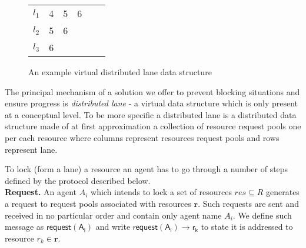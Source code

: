 \begin{figure}
\begin{center}
\begin{tabular}{ c | c | c | c | c | c }
			\cellcolor{gray!45}	$l_1$\hspace{.05cm}&\cellcolor{gray!45}		\hspace{.1cm}			4 &	      	   \cellcolor{gray!25}\hspace{.1cm} 5    &\cellcolor{gray!10}\hspace{.1cm} 6    \\[1mm] 
			
			\cellcolor{gray!25}	$l_2$\hspace{.05cm}&\cellcolor{gray!25}		\hspace{.1cm}		    5 &	     \cellcolor{gray!10}\hspace{.1cm} 6                  \\[1mm] 
			
			\cellcolor{gray!10}	$l_3$\hspace{.05cm}&\cellcolor{gray!10}	\hspace{.1cm} 	6   	                  \\[1mm]
			
		\end{tabular}
		
	\end{center}
	
	\caption{An example virtual distributed lane data structure}
	\label{lane}
\end{figure}


The principal mechanism of a solution we offer to prevent blocking situations and ensure progress is \textit{distributed lane} - a virtual data structure which is only present at a conceptual level. To be more specific a distributed lane is a distributed data structure made of at first approximation a collection of resource request pools one per each resource where columns represent resources request pools and rows represent lane. 

To lock (form a lane) a resource an agent has to go through a number of steps defined by the protocol described below. \\


\noindent \textbf{Request.} An agent $A_i$ which intends to lock a set of resources $res \subseteq R$ generates a request to request pools associated with resources $\mathbf{r}$. Such requests are sent and received in no particular order and contain only agent name $A_i$. We define such message as $\mathsf{request(A_i)}$ and write $\mathsf{request(A_i) \rightarrow r_k}$ to state it is addressed to resource $r_k \in \mathbf{r}$. \\



